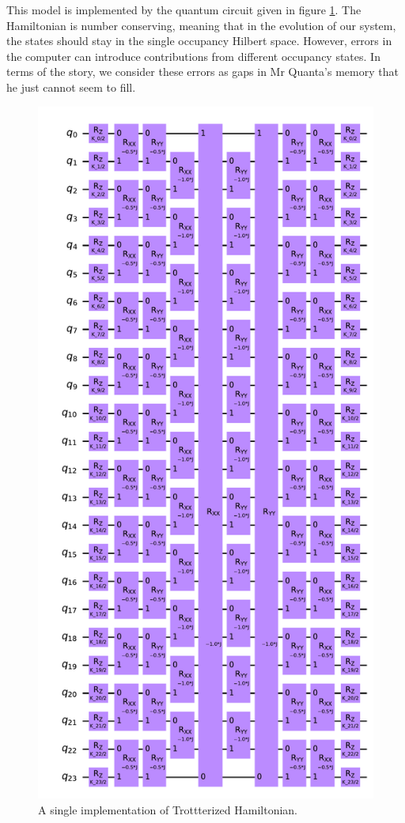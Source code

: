 \documentclass[11pt]{article}
\begin{document}
    This model is implemented by the quantum circuit given in figure \ref{fig:Circuit}. The Hamiltonian is number conserving, meaning that in the evolution of our system, the states should stay in the single occupancy Hilbert space. However, errors in the computer can introduce contributions from different occupancy states. In terms of the story, we consider these errors as gaps in Mr Quanta's memory that he just cannot seem to fill.  
    \begin{figure}[H]
      \centering
      \includegraphics[scale =  0.2]{Figures/Unitary_Gate_iQuHACK23.pdf}
      \caption{A single implementation of Trottterized Hamiltonian.}\label{fig:Circuit}
    \end{figure}
    
      

  
  
  
\end{document}
